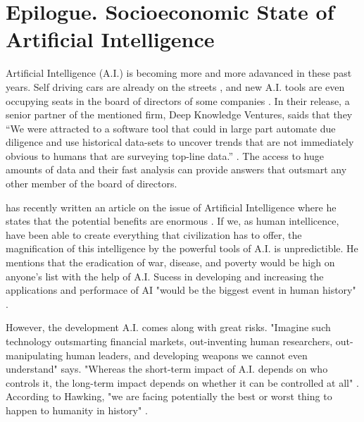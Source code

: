 
\chapter{Epilogue. Socioeconomic State of Artificial Intelligence} %

\label{Epilogue} %


Artificial Intelligence (A.I.) is becoming more and more adavanced in these past years. Self driving cars are already on the streets \cite{google}, and new A.I. tools are even occupying seats in the board of directors of some companies \cite{board}. In their release, a senior partner of the mentioned firm, Deep Knowledge Ventures, saids that they “We were attracted to a software tool that could in large part automate due diligence and use historical data-sets to uncover trends that are not immediately obvious to humans that are surveying top-line data.” \cite{board}. The access to huge amounts of data and their fast analysis can provide answers that outsmart any other member of the board of directors.

\citeauthor{hawking} has recently written an article on the issue of Artificial Intelligence where he states that the potential benefits are enormous \cite{hawking}. If we, as human intellicence, have been able to create everything that civilization has to offer, the magnification of this intelligence by the powerful tools of A.I. is unpredictible. He mentions that the eradication of war, disease, and poverty would be high on anyone's list with the help of A.I. Sucess in developing and increasing the applications and performace of AI "would be the biggest event in human history" \cite{hawking}. 

However, the development A.I. comes along with great risks. "Imagine such technology outsmarting financial markets, out-inventing human researchers, out-manipulating human leaders, and developing weapons we cannot even understand" \citeauthor{hawking} says. "Whereas the short-term impact of A.I. depends on who controls it, the long-term impact depends on whether it can be controlled at all" \cite{hawking}. According to Hawking, "we are facing potentially the best or worst thing to happen to humanity in history" \cite{hawking}.

